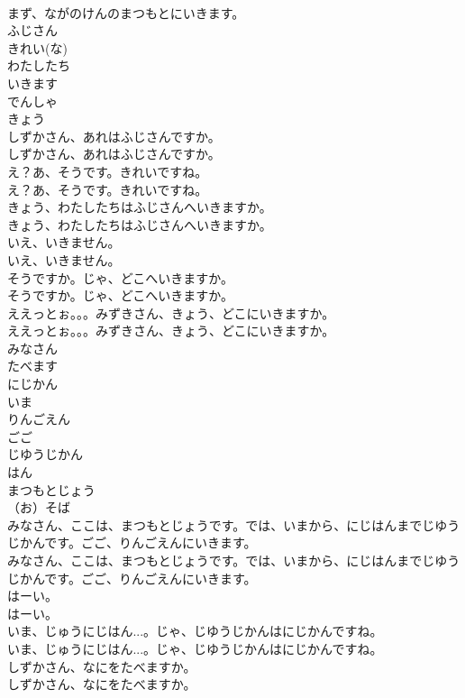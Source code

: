 \documentclass[8pt]{extreport}
\begin{document}
\begin{CJK}{UTF8}{min}
\\	まず、ながのけんのまつもとにいきます。 
\\	ふじさん
\\	きれい(な)
\\	わたしたち
\\	いきます
\\	でんしゃ
\\	きょう
\\	しずかさん、あれはふじさんですか。	
\\	しずかさん、あれはふじさんですか。 
\\	え？あ、そうです。きれいですね。	
\\	え？あ、そうです。きれいですね。 
\\	きょう、わたしたちはふじさんへいきますか。	
\\	きょう、わたしたちはふじさんへいきますか。 
\\	いえ、いきません。	
\\	いえ、いきません。 
\\	そうですか。じゃ、どこへいきますか。	
\\	そうですか。じゃ、どこへいきますか。 
\\	ええっとぉ。。。みずきさん、きょう、どこにいきますか。	
\\	ええっとぉ。。。みずきさん、きょう、どこにいきますか。 
\\	みなさん
\\	たべます
\\	にじかん
\\	いま
\\	りんごえん
\\	ごご
\\	じゆうじかん
\\	はん
\\	まつもとじょう
\\	（お）そば
\\	みなさん、ここは、まつもとじょうです。では、いまから、にじはんまでじゆうじかんです。ごご、りんごえんにいきます。	
\\	みなさん、ここは、まつもとじょうです。では、いまから、にじはんまでじゆうじかんです。ごご、りんごえんにいきます。 
\\	はーい。	
\\	はーい。 
\\	いま、じゅうにじはん...。じゃ、じゆうじかんはにじかんですね。	
\\	いま、じゅうにじはん...。じゃ、じゆうじかんはにじかんですね。 
\\	しずかさん、なにをたべますか。	
\\	しずかさん、なにをたべますか。 

\end{CJK}
\end{document}
